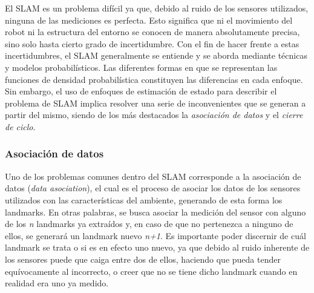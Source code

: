 El SLAM es un problema difícil ya que, debido al ruido de los sensores utilizados, ninguna de las mediciones es perfecta. Esto significa que ni el movimiento del robot ni la estructura del entorno se conocen de manera absolutamente precisa, sino solo hasta cierto grado de incertidumbre. Con el fin de hacer frente a estas incertidumbres, el SLAM generalmente se entiende y se aborda mediante técnicas y modelos probabilísticos. Las diferentes formas en que se representan las funciones de densidad probabilística constituyen las diferencias en cada enfoque. 
Sin embargo, el uso de enfoques de estimación de estado para describir el problema de SLAM implica resolver una serie de inconvenientes que se generan a partir del mismo, siendo de los más destacados la \textit{asociación de datos} \cite{duarrant2006a}\cite{duarrant2006b} y el \textit{cierre de ciclo}.

\subsubsection{Asociación de datos}
Uno de los problemas comunes dentro del SLAM corresponde a la asociación de datos (\textit{data asociation}), el cual es el proceso de asociar los datos de los sensores utilizados con las características del ambiente, generando de esta forma los landmarks. En otras palabras, se busca asociar la medición del sensor con alguno de los \textit{n} landmarks ya extraídos y, en caso de que no pertenezca a ninguno de ellos, se generará un landmark nuevo \textit{n+1}. Es importante poder discernir de cuál landmark se trata o si es en efecto uno nuevo, ya que debido al ruido inherente de los sensores puede que caiga entre dos de ellos, 
haciendo que pueda tender equívocamente al incorrecto, o creer que no se tiene dicho landmark cuando en realidad era uno ya medido.


